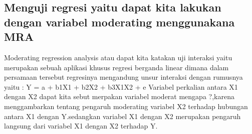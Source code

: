 \subsection{Menguji regresi yaitu dapat kita lakukan  dengan variabel moderating menggunakana MRA}
Moderating regression analysis atau dapat kita katakan uji interaksi yaitu merupakan sebuah aplikasi khusus regresi berganda linear 
dimana dalam persamaan tersebut regresinya mengandung unsur interaksi dengan rumusnya yaitu :
Y = a + b1X1  + b2X2 + b3X1X2 + e
Variabel perkalian antara X1 dengan X2 dapat kita sebut  merpakan variabel moderat mengapa ?,karena menggambarkan tentang pengaruh 
moderating variabel X2 terhadap hubungan antara X1 dengan Y.sedangkan variabel X1 dengan X2 merupakan pengaruh langsung dari variabel X1 
dengan X2 terhadap Y. 


